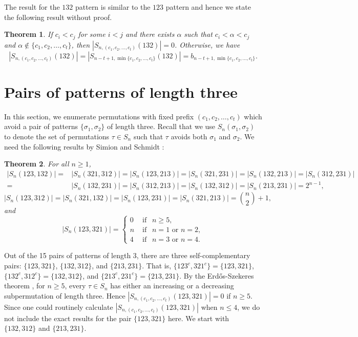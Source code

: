 \documentclass[11pt]{article}
\newtheorem{theorem}{Theorem}[section]
\theoremstyle{definition}
\numberwithin{equation}{section}
\begin{document}
The result for the $132$ pattern is similar to the $123$ pattern and hence we state the following result without proof.

\begin{theorem}\label{Theorem:132LeadingTerms}
If $c_i<c_j$ for some $i<j$ and there exists $\alpha$ such that $c_i<\alpha<c_j$ and $\alpha\notin\{c_1,c_2,\ldots,c_t\}$, then $|S_{n,(c_1,c_2,\ldots,c_t)}(132)|=0$. Otherwise, we have
    \[|S_{n,(c_1,c_2,\ldots,c_t)}(132)|=|S_{n-t+1,\min\{c_1,c_2,\ldots,c_t\}}(132)|=b_{n-t+1,\min\{c_1,c_2,\ldots,c_t\}}.
    \]
\end{theorem}



\section{Pairs of patterns of length three}\label{Section:Pair3}
In this section, we enumerate permutations with fixed prefix $(c_1,c_2,\ldots,c_t)$ 
which 
avoid a pair of patterns $\{\sigma_1,\sigma_2\}$ of length three. Recall that we use $S_n(\sigma_1,\sigma_2)$ to denote the set of permutations $\tau\in S_n$ such that $\tau$ avoids both $\sigma_1$ and $\sigma_2$. 
We need the following results by Simion and Schmidt \cite[Section 3]{SimionSchmidt1985}:

\begin{theorem}{\rm\cite[Section 3]{SimionSchmidt1985}}\label{Theorem:Pairs3}
For all $n\geq1$,
    \[
   \begin{split}
|S_n(123,132)|=&|S_n(321,312)|=|S_n(123,213)|=|S_n(321,231)|=|S_n(132,213)|=|S_n(312,231)|\\=&|S_n(132,231)|=|S_n(312,213)|=|S_n(132,312)|=|S_n(213,231)|=2^{n-1},
   \end{split} 
    \]
    \[
    |S_n(123,312)|=|S_n(321,132)|=|S_n(123,231)|=|S_n(321,213)|=\binom{n}{2}+1,
    \]
    and
\[
|S_n(123,321)|=\left\{\begin{array}{ll}
 0    & \text{ if }~~n\geq5, \\
 n    & \text{ if }~~n=1\text{ or }n=2,\\
 4    & \text{ if }~~n=3\text{ or }n=4.
\end{array}\right.
\]
\end{theorem}

Out of the 15 pairs of patterns of length 3, there are three self-complementary pairs: $\{123,321\}$, $\{132,312\}$, and $\{213,231\}$. That is, $\{123^c,321^c\}=\{123,321\}$, $\{132^c,312^c\}=\{132,312\}$, and $\{213^c,231^c\}=\{213,231\}$. By the Erd\H{o}s-Szekeres theorem \cite[p. 467]{ErdosSzekeres1935}, 
for $n\geq5$, every $\tau\in S_n$ has either an increasing 
or a decreasing subpermutation of length three. 
Hence $|S_{n,(c_1,c_2,\ldots,c_t)}(123,321)|=0$ if $n\geq5$. Since one could routinely calculate $|S_{n,(c_1,c_2,\ldots,c_t)}(123,321)|$ when $n\leq4$, we do not include the exact results for the pair $\{123, 321\}$ here. We start with $\{132,312\}$ and $\{213,231\}$.
\end{document}
